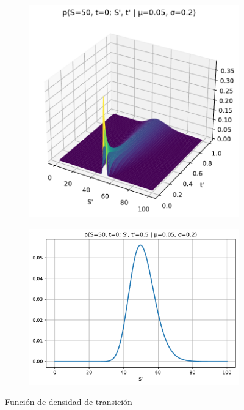 \begin{figure}[H]
    \centering
    \begin{subfigure}[b]{0.45\linewidth}
        \includegraphics[width=\linewidth]{Imagenes/Parte1/3_Aleatoriedad/PDF_3D.pdf}
    \end{subfigure}
        \begin{subfigure}[b]{0.45\linewidth}
        \includegraphics[width=\linewidth]{Imagenes/Parte1/3_Aleatoriedad/PDF_2D.pdf}
    \end{subfigure}
    \caption{Función de densidad de transición}
\end{figure}



